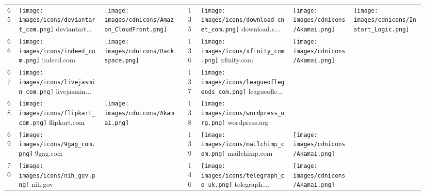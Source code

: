 \begin{table}[tbp]
\begin{tabular}{|llll|llll|}
65 & \texttt{[image: images/icons/deviantart\_com.png]} deviantart... & \texttt{[image: images/cdnicons/Amazon\_CloudFront.png]} & & 135 & \texttt{[image: images/icons/download\_cnet\_com.png]} download.c... & \texttt{[image: images/cdnicons/Akamai.png]} & \texttt{[image: images/cdnicons/Instart\_Logic.png]} \\
66 & \texttt{[image: images/icons/indeed\_com.png]} indeed.com & \texttt{[image: images/cdnicons/Rackspace.png]} & & 136 & \texttt{[image: images/icons/xfinity\_com.png]} xfinity.com & \texttt{[image: images/cdnicons/Akamai.png]} & \\
67 & \texttt{[image: images/icons/livejasmin\_com.png]} livejasmin... & & & 137 & \texttt{[image: images/icons/leagueoflegends\_com.png]} leagueofle... & & \\
68 & \texttt{[image: images/icons/flipkart\_com.png]} flipkart.com & \texttt{[image: images/cdnicons/Akamai.png]} & & 138 & \texttt{[image: images/icons/wordpress\_org.png]} wordpress.org & & \\
69 & \texttt{[image: images/icons/9gag\_com.png]} 9gag.com & & & 139 & \texttt{[image: images/icons/mailchimp\_com.png]} mailchimp.com & \texttt{[image: images/cdnicons/Akamai.png]} & \\
70 & \texttt{[image: images/icons/nih\_gov.png]} nih.gov & & & 140 & \texttt{[image: images/icons/telegraph\_co\_uk.png]} telegraph.... & \texttt{[image: images/cdnicons/Akamai.png]} & \\
\hline
\end{tabular}
\end{table}

